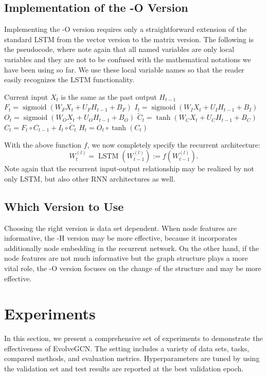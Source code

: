 \documentclass[letterpaper]{article} %
\DeclareMathOperator{\sigmoid}{sigmoid}
\DeclareMathOperator{\lstm}{LSTM}
\begin{document}
\subsection{Implementation of the -O Version}
Implementing the -O version requires only a straightforward extension of the standard LSTM from the vector version to the matrix version. The following is the pseudocode, where note again that all named variables are only local variables and they are not to be confused with the mathematical notations we have been using so far. We use these local variable names so that the reader easily recognizes the LSTM functionality.

\begin{algorithmic}[1]
  \baselineskip=15pt
  \State Current input $X_t$ is the same as the past output $H_{t-1}$
  \State $F_t = \sigmoid(W_FX_t + U_FH_{t-1} + B_F)$
  \State $I_t = \sigmoid(W_IX_t + U_IH_{t-1} + B_I)$
  \State $O_t = \sigmoid(W_OX_t + U_OH_{t-1} + B_O)$
  \State $\widetilde{C}_t = \tanh(W_CX_t + U_CH_{t-1}+B_C)$
  \State $C_t = F_t \circ C_{t-1} + I_t \circ \widetilde{C}_t$
  \State $H_t = O_t \circ \tanh(C_t)$
  \EndFunction
\end{algorithmic}

With the above function $f$, we now completely specify the recurrent architecture:
\[
  W_t^{(l)} = \lstm(W_{t-1}^{(l)})
  := f(W_{t-1}^{(l)}).
\]
Note again that the recurrent input-output relationship may be realized by not only LSTM, but also other RNN architectures as well.


\subsection{Which Version to Use}
Choosing the right version is data set dependent. When node features are informative, the -H version may be more effective, because it incorporates additionally node embedding in the recurrent network. On the other hand, if the node features are not much informative but the graph structure plays a more vital role, the -O version focuses on the change of the structure and may be more effective.


\section{Experiments}
In this section, we present a comprehensive set of experiments to demonstrate the effectiveness of EvolveGCN. The setting includes a variety of data sets, tasks, compared methods, and evaluation metrics. Hyperparameters are tuned by using the validation set and test results are reported at the best validation epoch.
\end{document}
